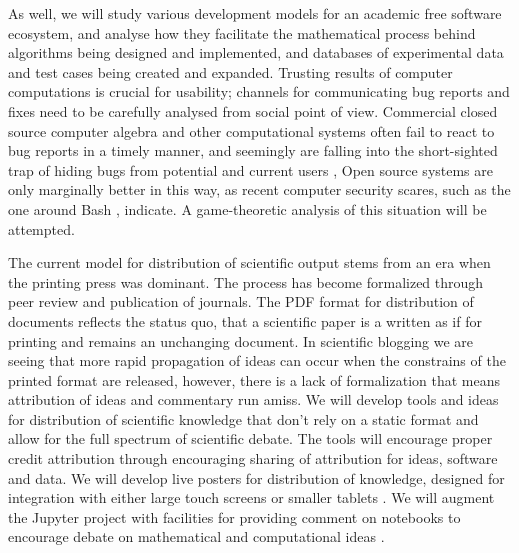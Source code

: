 \begin{workpackage}[id=social-aspects,wphases=0-48,
  title=Social Aspects,
  lead=UO,
  UORM=51,USHRM=8, USORM=6]
\begin{wpdescription}
As well, we will study various development models for an academic free
software ecosystem, and analyse how they facilitate the mathematical
process behind algorithms being designed and implemented, and
databases of experimental data and test cases being created and
expanded.  Trusting results of computer computations is crucial for
usability; channels for communicating bug reports and fixes need to be
carefully analysed from social point of view.  Commercial closed
source computer algebra and other computational systems often fail to
react to bug reports in a timely manner, and seemingly are falling
into the short-sighted trap of hiding bugs from potential and current
users \cite{misfort}, Open source systems are only marginally better
in this way, as recent computer security scares, such as the one
around Bash \cite{shellshock}, indicate.  A game-theoretic analysis of
this situation will be attempted.
\end{wpdescription}

\begin{tasklist}
\begin{task}[title=Modern Distribution of Scientific Output]
   The current model
  for distribution of scientific output stems from an era when the
  printing press was dominant. The process has become formalized
  through peer review and publication of journals. The PDF format for
  distribution of documents reflects the status quo, that a scientific
  paper is a written as if for printing and remains an unchanging
  document. In scientific blogging we are seeing that more rapid
  propagation of ideas can occur when the constrains of the printed
  format are released, however, there is a lack of formalization that
  means attribution of ideas and commentary run amiss. We will develop
  tools and ideas for distribution of scientific knowledge that don't
  rely on a static format and allow for the full spectrum of
  scientific debate. The tools will encourage proper credit
  attribution through encouraging sharing of attribution for ideas,
  software and data. We will develop live posters for distribution of
  knowledge, designed for integration with either large touch screens
  or smaller tablets . We will augment
  the Jupyter project with facilities for providing comment on
  notebooks to encourage debate on mathematical and computational
  ideas .
\end{task}


\end{tasklist}
\end{workpackage}
